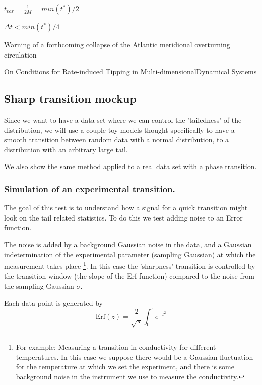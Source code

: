 	$t_{var}=\frac{1}{2M}=min(t^*)/2$
	
	
	$ \Delta t < min(t^*)/4 $
	


Warning of a forthcoming collapse of the Atlantic
meridional overturning circulation

On Conditions for Rate-induced Tipping in Multi-dimensionalDynamical Systems


\subsection{Sharp transition mockup}	
\label{ewsapx: transition}

Since we want to have a data set where we can control the 'tailedness' of the distribution, we will use a couple toy models thought specifically to have a smooth transition between random data with a normal distribution, to a distribution with an arbitrary large tail. 

We also show the same method applied to a real data set with a phase transition.

\subsubsection{Simulation of an experimental transition.}
The goal of this test is to understand how a signal for a quick transition might look on the tail related statistics. To do this we test adding noise to an Error function.

The noise is added by a background Gaussian noise in the data, and a Gaussian indetermination of the experimental parameter (sampling Gaussian) at which the measurement takes place \footnote{For example: Measuring a transition in conductivity for different temperatures. 
	In this case we suppose there would be a Gaussian fluctuation for the temperature at which we set the experiment, and there is some background noise in the instrument we use to measure the conductivity. }. 
In this case the 'sharpness' transition is controlled by the transition window (the slope of the Erf function) compared to the noise from the sampling Gaussian $\sigma$.

Each data point is generated by 
\begin{equation}
	\mathrm{Erf}(z)=\frac{2}{\sqrt{\pi}}\int_0^z e^{-t^2}
\end{equation}

